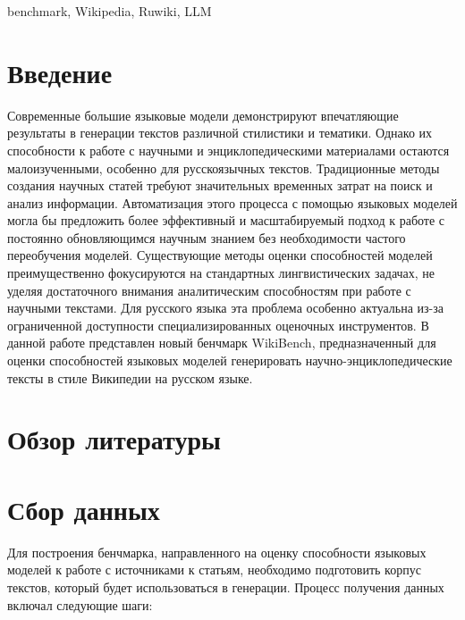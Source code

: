 \documentclass{article}
\theoremstyle{definition}
\theoremstyle{plain}
\begin{document}
\begin{altkeywords}
benchmark, Wikipedia, Ruwiki, LLM
\end{altkeywords}


\section*{Введение}

Современные большие языковые модели демонстрируют впечатляющие результаты в генерации текстов различной стилистики и тематики. 
Однако их способности к работе с научными и энциклопедическими материалами остаются малоизученными, особенно для русскоязычных текстов. 
Традиционные методы создания научных статей требуют значительных временных затрат на поиск и анализ информации. 
Автоматизация этого процесса с помощью языковых моделей могла бы предложить более эффективный и масштабируемый подход к работе с постоянно обновляющимся научным знанием без необходимости частого переобучения моделей.
Существующие методы оценки способностей моделей преимущественно фокусируются на стандартных лингвистических задачах, не уделяя достаточного внимания аналитическим способностям при работе с научными текстами.
Для русского языка эта проблема особенно актуальна из-за ограниченной доступности специализированных оценочных инструментов.
В данной работе представлен новый бенчмарк WikiBench, предназначенный для оценки способностей языковых моделей генерировать научно-энциклопедические тексты в стиле Википедии на русском языке. 

\section*{Обзор литературы}
\section*{Сбор данных}

Для построения бенчмарка, направленного на оценку способности языковых моделей к работе с источниками к статьям, необходимо подготовить корпус текстов, который будет использоваться в генерации. Процесс получения данных включал следующие шаги:
\end{document}

